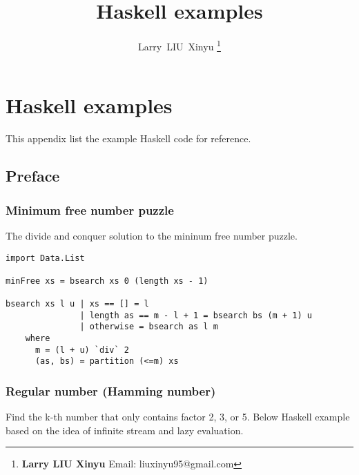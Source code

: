 \documentclass{article}
\begin{document}


\title{Haskell examples}

\author{Larry~LIU~Xinyu
\thanks{{\bfseries Larry LIU Xinyu } \newline
  Email: liuxinyu95@gmail.com \newline}
  }

\maketitle
\fi


\ifx\wholebook\relax
\chapter{Haskell examples}
\fi

This appendix list the example Haskell code for reference.

\section{Preface}

\subsection{Minimum free number puzzle}
The divide and conquer solution to the mininum free number puzzle.

\lstset{language=Haskell}
\begin{lstlisting}
import Data.List

minFree xs = bsearch xs 0 (length xs - 1)

bsearch xs l u | xs == [] = l
               | length as == m - l + 1 = bsearch bs (m + 1) u
               | otherwise = bsearch as l m
    where
      m = (l + u) `div` 2
      (as, bs) = partition (<=m) xs
\end{lstlisting}

\subsection{Regular number (Hamming number)}
Find the k-th number that only contains factor 2, 3, or 5. Below Haskell
example based on the idea of infinite stream and lazy evaluation.
\end{document}
